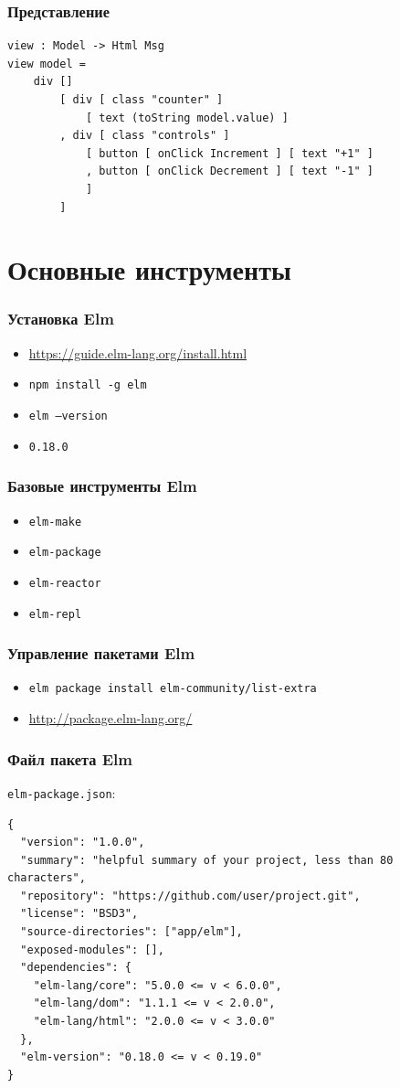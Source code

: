 \documentclass[11pt,aspectratio=169]{beamer}
\begin{document}
\begin{frame}[fragile]
\frametitle{Представление}
\begin{lstlisting}
view : Model -> Html Msg
view model =
    div []
        [ div [ class "counter" ]
            [ text (toString model.value) ]
        , div [ class "controls" ]
            [ button [ onClick Increment ] [ text "+1" ]
            , button [ onClick Decrement ] [ text "-1" ]
            ]
        ]
\end{lstlisting}
\end{frame}


\section{Основные инструменты}

\begin{frame}
\frametitle{Установка Elm}
\begin{itemize}
	\item \url{https://guide.elm-lang.org/install.html}
	\item \texttt{npm install -g elm}
	\item \texttt{elm --version}
	\item \texttt{0.18.0}
\end{itemize}
\end{frame}

\begin{frame}
\frametitle{Базовые инструменты Elm}
\begin{itemize}
	\item \texttt{elm-make}
	\item \texttt{elm-package}
	\item \texttt{elm-reactor}
	\item \texttt{elm-repl}
\end{itemize}
\end{frame}

\begin{frame}
\frametitle{Управление пакетами Elm}
\begin{itemize}
	\item \texttt{elm package install elm-community/list-extra}
	\item \url{http://package.elm-lang.org/}
\end{itemize}
\end{frame}

\begin{frame}[fragile]
\frametitle{Файл пакета Elm}
\texttt{elm-package.json}:
\begin{lstlisting}
{
  "version": "1.0.0",
  "summary": "helpful summary of your project, less than 80 characters",
  "repository": "https://github.com/user/project.git",
  "license": "BSD3",
  "source-directories": ["app/elm"],
  "exposed-modules": [],
  "dependencies": {
    "elm-lang/core": "5.0.0 <= v < 6.0.0",
    "elm-lang/dom": "1.1.1 <= v < 2.0.0",
    "elm-lang/html": "2.0.0 <= v < 3.0.0"
  },
  "elm-version": "0.18.0 <= v < 0.19.0"
}
\end{lstlisting}
\end{frame}
\end{document}
